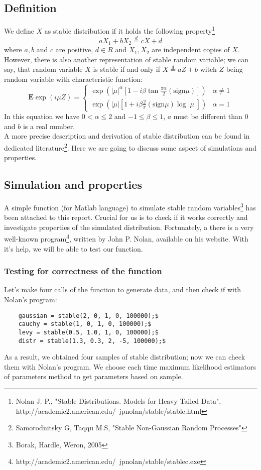 \documentclass{article}
\begin{document}
	\subsection{Definition}
	We define $X$ as stable distribution if it holds the following property\footnote{Nolan J. P., "Stable Distributions. Models for Heavy Tailed Data", http://academic2.american.edu/~jpnolan/stable/stable.html}
	\begin{equation}
	aX_1+bX_2 \stackrel{d}{=} cX + d
	\end{equation}
	where $a, b$ and $c$ are positive, $d\in R$ and $X_1, X_2$ are independent copies of $X$.
	However, there is also another representation of stable random variable; we can say, that random variable $X$ is stable if and only if $X \stackrel{d}{=} aZ + b$ witch $Z$ being random variable with characteristic function:
	\begin{equation}
		\mathbf{E} \exp(i\mu Z) = \begin{cases}
		\exp(|\mu|^\alpha[1-i\beta \tan\frac{\pi \alpha}{2}(\mbox{sign}\mu)]) & \alpha \neq 1 \\
		\exp(|\mu|[1+i\beta \frac{2}{\pi} (\mbox{sign}\mu) \log |\mu|]) & \alpha = 1
		\end{cases}
	\end{equation}
In this equation we have $0<\alpha \leq 2$ and $-1 \leq \beta \leq 1$, $a$ must be different than $0$ and $b$ is a real number.\\
A more precise description and derivation of stable distribution can be found in dedicated literature\footnote{Samorodnitsky G, Taqqu M.S, "Stable Non-Gaussian Random Processes"}. Here we are going to discuss some aspect of simulations and properties.
	\subsection{Simulation and properties}
	A simple function (for Matlab language) to simulate stable random variables\footnote{Borak, Hardle, Weron, 2005} has been attached to this report. Crucial for us is to check if it works correctly and investigate properties of the simulated distribution. Fortunately, a there is a very well-known program\footnote{http://academic2.american.edu/~jpnolan/stable/stablec.exe}, written by John P. Nolan, available on his website. With it's help, we will be able to test our function.
	\subsubsection{Testing for correctness of the function}
	Let's make four calls of the function to generate data, and then check if with Nolan's program:
	\begin{lstlisting}
	gaussian = stable(2, 0, 1, 0, 100000);$
	cauchy = stable(1, 0, 1, 0, 100000);$
	levy = stable(0.5, 1.0, 1, 0, 100000);$
	distr = stable(1.3, 0.3, 2, -5, 100000);$
	\end{lstlisting}
	As a result, we obtained four samples of stable distribution; now we can check them with Nolan's program. We choose each time maximum likelihood estimators of parameters method to get parameters based on sample. \\
	
\end{document}
